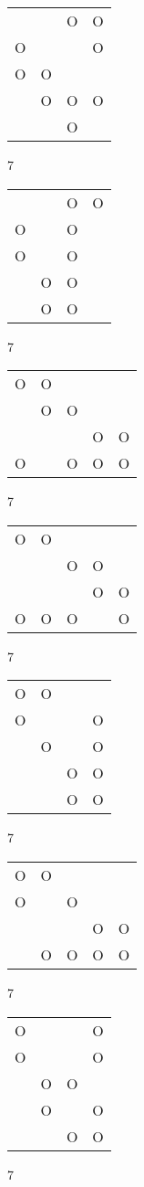 \begin{tabular}{|m{0.2cm}m{0.2cm}m{0.2cm}m{0.2cm}|}\hline
 & &O&O\\
O& & &O\\
O&O& & \\
 &O&O&O\\
 & &O& \\
\hline\end{tabular}7
\begin{tabular}{|m{0.2cm}m{0.2cm}m{0.2cm}m{0.2cm}|}\hline
 & &O&O\\
O& &O& \\
O& &O& \\
 &O&O& \\
 &O&O& \\
\hline\end{tabular}7
\begin{tabular}{|m{0.2cm}m{0.2cm}m{0.2cm}m{0.2cm}m{0.2cm}|}\hline
O&O& & & \\
 &O&O& & \\
 & & &O&O\\
O& &O&O&O\\
\hline\end{tabular}7
\begin{tabular}{|m{0.2cm}m{0.2cm}m{0.2cm}m{0.2cm}m{0.2cm}|}\hline
O&O& & & \\
 & &O&O& \\
 & & &O&O\\
O&O&O& &O\\
\hline\end{tabular}7
\begin{tabular}{|m{0.2cm}m{0.2cm}m{0.2cm}m{0.2cm}|}\hline
O&O& & \\
O& & &O\\
 &O& &O\\
 & &O&O\\
 & &O&O\\
\hline\end{tabular}7
\begin{tabular}{|m{0.2cm}m{0.2cm}m{0.2cm}m{0.2cm}m{0.2cm}|}\hline
O&O& & & \\
O& &O& & \\
 & & &O&O\\
 &O&O&O&O\\
\hline\end{tabular}7
\begin{tabular}{|m{0.2cm}m{0.2cm}m{0.2cm}m{0.2cm}|}\hline
O& & &O\\
O& & &O\\
 &O&O& \\
 &O& &O\\
 & &O&O\\
\hline\end{tabular}7
